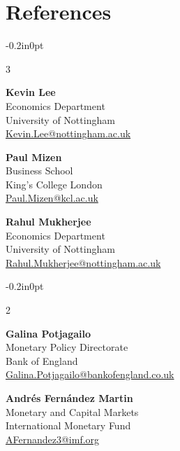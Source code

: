 \documentclass[11pt,letterpaper]{article}%
\begin{document}
\section*{References}
\vspace{-0.5cm} 
\begin{adjustwidth}{-0.2in}{0pt}  %
\setlength{\columnsep}{-10pt} %
\begin{multicols}{3}
{\footnotesize
\begin{list}{}{} 
\item \textbf{Kevin Lee} \\
Economics Department \\
University of Nottingham \\
\href{mailto:Kevin.Lee@nottingham.ac.uk}{Kevin.Lee@nottingham.ac.uk} \\
\item \textbf{Paul Mizen} \\
Business School \\ King’s College London \\
\href{mailto:Paul.Mizen@kcl.ac.uk}{Paul.Mizen@kcl.ac.uk} \\
\item \textbf{Rahul Mukherjee} \\
Economics Department \\
University of Nottingham \\
\href{mailto:Rahul.Mukherjee@nottingham.ac.uk}{Rahul.Mukherjee@nottingham.ac.uk}
\end{list}	
}
\end{multicols}
\end{adjustwidth}

\vspace{-0.5cm}
\begin{adjustwidth}{-0.2in}{0pt}  %
\setlength{\columnsep}{-10pt} %
\begin{multicols}{2}
{\small
\begin{list}{}{} 
\item \textbf{Galina Potjagailo} \\
Monetary Policy Directorate \\
Bank of England\\
\href{mailto:Galina.Potjagailo@bankofengland.co.uk}{Galina.Potjagailo@bankofengland.co.uk} 

\item \textbf{Andrés Fernández Martin} \\
Monetary and Capital Markets \\ International Monetary Fund \\ \href{mailto:AFernandez3@imf.org}{AFernandez3@imf.org} 
\end{list}	
}
\end{multicols}
\end{adjustwidth}
\end{document}
